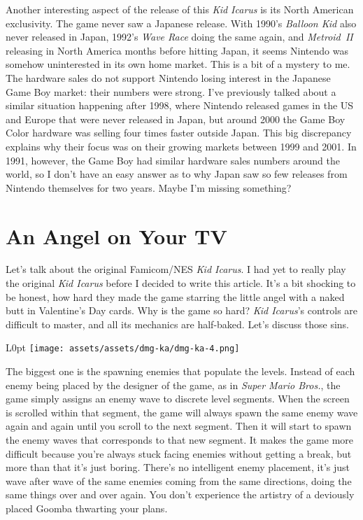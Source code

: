 \documentclass{book}
\begin{document}
Another interesting aspect of the release of this \emph{Kid Icarus} is its North American exclusivity. The game never saw a Japanese release. With 1990’s \emph{Balloon Kid} also never released in Japan, 1992’s \emph{Wave Race} doing the same again, and \emph{Metroid II} releasing in North America months before hitting Japan, it seems Nintendo was somehow uninterested in its own home market. This is a bit of a mystery to me. The hardware sales do not support Nintendo losing interest in the Japanese Game Boy market: their numbers were strong. I’ve previously talked about a similar situation happening after 1998, where Nintendo released games in the US and Europe that were never released in Japan, but around 2000 the Game Boy Color hardware was selling four times faster outside Japan. This big discrepancy explains why their focus was on their growing markets between 1999 and 2001. In 1991, however, the Game Boy had similar hardware sales numbers around the world, so I don’t have an easy answer as to why Japan saw so few releases from Nintendo themselves for two years. Maybe I’m missing something?

\FloatBarrier\needspace{10mm}\section*{An Angel on Your TV}\nopagebreak[4]

Let’s talk about the original Famicom/NES \emph{Kid Icarus}. I had yet to really play the original \emph{Kid Icarus} before I decided to write this article. It’s a bit shocking to be honest, how hard they made the game starring the little angel with a naked butt in Valentine’s Day cards. Why is the game so hard? \emph{Kid Icarus}’s controls are difficult to master, and all its mechanics are half-baked. Let’s discuss those sins.

\begin{wrapfigure}{L}{0pt} \texttt{[image: assets/assets/dmg-ka/dmg-ka-4.png]}\end{wrapfigure}
The biggest one is the spawning enemies that populate the levels. Instead of each enemy being placed by the designer of the game, as in \emph{Super Mario Bros.}, the game simply assigns an enemy wave to discrete level segments. When the screen is scrolled within that segment, the game will always spawn the same enemy wave again and again until you scroll to the next segment. Then it will start to spawn the enemy waves that corresponds to that new segment. It makes the game more difficult because you’re always stuck facing enemies without getting a break, but more than that it’s just boring. There’s no intelligent enemy placement, it’s just wave after wave of the same enemies coming from the same directions, doing the same things over and over again. You don’t experience the artistry of a deviously placed Goomba thwarting your plans.
\end{document}
